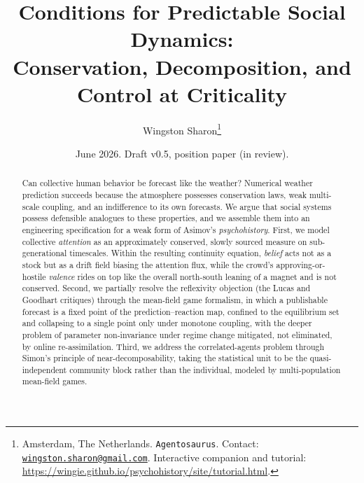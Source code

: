 \documentclass[11pt]{article}
\title{Conditions for Predictable Social Dynamics:\\ Conservation, Decomposition, and Control at Criticality}
\author{Wingston Sharon\thanks{Amsterdam, The Netherlands. \texttt{Agentosaurus}. Contact: \href{mailto:wingston.sharon@gmail.com}{\texttt{wingston.sharon@gmail.com}}. Interactive companion and tutorial: \url{https://wingie.github.io/psychohistory/site/tutorial.html}.}}
\date{June 2026. Draft v0.5, position paper (in review).}
\begin{document}
\maketitle

\begin{abstract}
Can collective human behavior be forecast like the weather? Numerical weather prediction succeeds because the atmosphere possesses conservation laws, weak multi-scale coupling, and an indifference to its own forecasts. We argue that social systems possess defensible analogues to these properties, and we assemble them into an engineering specification for a weak form of Asimov's \emph{psychohistory}. First, we model collective \emph{attention} as an approximately conserved, slowly sourced measure on sub-generational timescales. Within the resulting continuity equation, \emph{belief} acts not as a stock but as a drift field biasing the attention flux, while the crowd's approving-or-hostile \emph{valence} rides on top like the overall north-south leaning of a magnet and is not conserved. Second, we partially resolve the reflexivity objection (the Lucas and Goodhart critiques) through the mean-field game formalism, in which a publishable forecast is a fixed point of the prediction--reaction map, confined to the equilibrium set and collapsing to a single point only under monotone coupling, with the deeper problem of parameter non-invariance under regime change mitigated, not eliminated, by online re-assimilation. Third, we address the correlated-agents problem through Simon's principle of near-decomposability, taking the statistical unit to be the quasi-independent community block rather than the individual, modeled by multi-population mean-field games.


\end{abstract}
\end{document}
